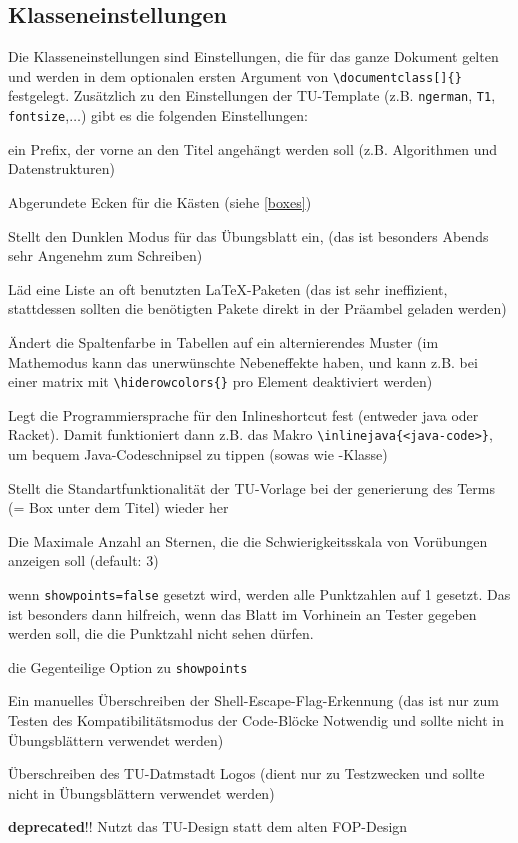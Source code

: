 \documentclass[
    titleprefix=AlgoTeX,
    inlineshortcut=java,
    corporatedesign,
    boxarc,
]{algoexercise}
\begin{document}
    \subsection{Klasseneinstellungen}\label{Klasseneinstellungen}
    Die Klasseneinstellungen sind Einstellungen, die für das ganze Dokument gelten und werden in dem optionalen ersten Argument von \verb+\documentclass[]{}+ festgelegt. Zusätzlich zu den Einstellungen der TU-Template (z.B. \verb+ngerman+, \verb+T1+, \verb+fontsize+,$\ldots$) gibt es die folgenden Einstellungen:
    \begin{description}[leftmargin = 3cm]
        \item[titleprefix] ein Prefix, der vorne an den Titel angehängt werden soll (z.B. Algorithmen und Datenstrukturen)
        \item[boxarc] Abgerundete Ecken für die Kästen (siehe \ref{boxes})
        \item[dark\_mode] Stellt den Dunklen Modus für das Übungsblatt ein, (das ist besonders Abends sehr Angenehm zum Schreiben)
        \item[load\_common] Läd eine Liste an oft benutzten \LaTeX{}-Paketen (das ist sehr ineffizient, stattdessen sollten die benötigten Pakete direkt in der Präambel geladen werden)
        \item[fancy\_row\_color] Ändert die Spaltenfarbe in Tabellen auf ein alternierendes Muster (im Mathemodus kann das unerwünschte Nebeneffekte haben, und kann z.B. bei einer matrix mit \verb+\hiderowcolors{}+ pro Element deaktiviert werden)
        \item[inlineshortcut] Legt die Programmiersprache für den Inlineshortcut fest (entweder java oder Racket). Damit funktioniert dann z.B. das Makro \verb+\inlinejava{<java-code>}+, um bequem Java-Codeschnipsel zu tippen (sowas wie -Klasse)
        \item[manual\_term] Stellt die Standartfunktionalität der TU-Vorlage bei der generierung des Terms (= Box unter dem Titel) wieder her
        \item[maxdifficulty] Die Maximale Anzahl an Sternen, die die Schwierigkeitsskala von Vorübungen anzeigen soll (default: 3)
        \item[showpoints] wenn \verb+showpoints=false+ gesetzt wird, werden alle Punktzahlen auf 1 gesetzt. Das ist besonders dann hilfreich, wenn das Blatt im Vorhinein an Tester gegeben werden soll, die die Punktzahl nicht sehen dürfen.
        \item[hidepoints] die Gegenteilige Option zu \verb+showpoints+
        \item[shell\_escape] Ein manuelles Überschreiben der Shell-Escape-Flag-Erkennung (das ist nur zum Testen des Kompatibilitätsmodus der Code-Blöcke Notwendig und sollte nicht in Übungsblättern verwendet werden)
        \item[logopath] Überschreiben des TU-Datmstadt Logos (dient nur zu Testzwecken und sollte nicht in Übungsblättern verwendet werden)
        \item[corporatedesign] \textbf{deprecated}!! Nutzt das TU-Design statt dem alten FOP-Design
    \end{description}
\end{document}
